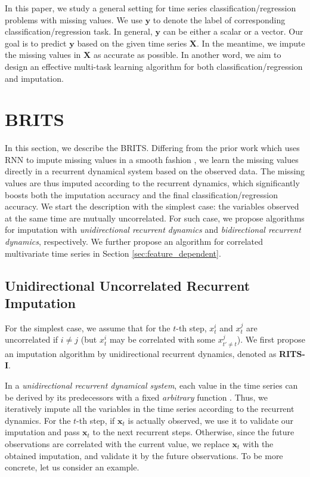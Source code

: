 \documentclass{article}
\newcommand{\methodname}{\xspace{BRITS}}
\newcommand{\x}{{\mathbf x}}
\newcommand{\y}{{\mathbf y}}
\newcommand{\X}{{\mathbf X}}
\begin{document}
In this paper, we study a general setting for time series classification/regression problems with missing values. We use $\y$ to denote the label of corresponding classification/regression task. In general, $\y$ can be either a scalar or a vector. Our goal is to predict $\y$ based on the given time series $\X$. In the meantime, we impute the missing values in $\X$ as accurate as possible. In another word, we aim to design an effective multi-task learning algorithm for both classification/regression and imputation.
 \section{\methodname}
\label{sec:feature_independent}

In this section, we describe the \methodname.  Differing from the prior work which uses RNN to impute missing values in a smooth fashion \cite{che2018recurrent}, we learn the missing values directly in a recurrent dynamical system \cite{pascanu2013difficulty,sussillo2013opening} based on the observed data. The missing values are thus imputed according to the recurrent dynamics, which significantly boosts both the imputation accuracy and the final classification/regression accuracy.
We start the description with the simplest case: the variables observed at the same time are mutually uncorrelated. For such case, we propose algorithms for imputation with {\em unidirectional recurrent dynamics} and {\em bidirectional recurrent dynamics}, respectively. We further propose an algorithm for correlated multivariate time series in Section \ref{sec:feature_dependent}.

\subsection{Unidirectional Uncorrelated Recurrent Imputation}
\label{sec:uni_impute}
For the simplest case, we assume that for the $t$-th step, $x_t^i$ and $x_t^j$ are uncorrelated if $i \ne j$ (but $x_t^i$ may be correlated with some $x_{t'\ne t}^{j}$). We first propose an imputation algorithm by unidirectional recurrent dynamics, denoted as {\bf RITS-I}.

In a {\em unidirectional recurrent dynamical system}, each value in the time series can be derived by its predecessors with a fixed {\em arbitrary} function \cite{brakel2013training,ozaki19852,basharat2009time}. Thus, we iteratively impute all the variables in the time series according to the  recurrent dynamics. For the $t$-th step, if $\x_t$ is actually observed, we use it to validate our imputation and pass $\x_t$ to the next recurrent steps. Otherwise, since the future observations are correlated with the current  value, 
we replace $\x_t$ with the obtained imputation, and validate it by the future observations. To be more concrete, let us consider an example.
\end{document}
